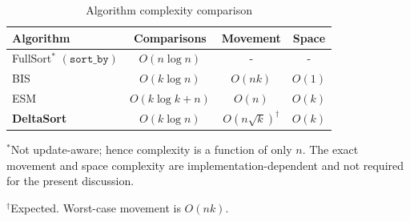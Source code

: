 \begin{table}[t]
\centering
\caption{Algorithm complexity comparison}
\label{tab:complexity}
\begin{tabular}{l c c c}
\toprule
Algorithm & Comparisons & Movement & Space \\
\midrule
FullSort$^{*}$ $(\texttt{sort\_by})$ & $O(n \log n)$ & - & - \\
BIS & $O(k \log n)$ & $O(nk)$ & $O(1)$ \\
ESM & $O(k \log k + n)$ & $O(n)$ & $O(k)$ \\
\textbf{DeltaSort} & $O(k \log n)$ & $O(n\sqrt{k})^{\dagger}$ & $O(k)$ \\
\bottomrule
\end{tabular}

\vspace{0.3em}
{\small $^{*}$Not update-aware; hence complexity is a function of only $n$. The exact movement and space complexity are implementation-dependent and not required for the present discussion.}

{\small $^{\dagger}$Expected. Worst-case movement is $O(nk)$.}
\end{table}